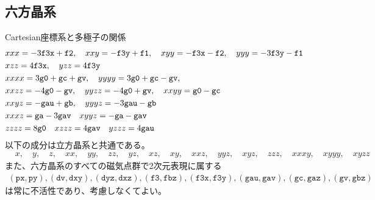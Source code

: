 \documentclass[11pt]{easymemo}
\begin{document}
\subsection{六方晶系}
Cartesian座標系と多極子の関係
\begin{align}
&
xxx= -3 \texttt{f3x} + \texttt{f2},
\quad
xxy= -\texttt{f3y} + \texttt{f1},
\quad
xyy= -\texttt{f3x} - \texttt{f2},
\quad
yyy= -3 \texttt{f3y} - \texttt{f1}
\cr&
xzz= 4 \texttt{f3x},
\quad
yzz= 4 \texttt{f3y}
\cr&
xxxx= 3 \texttt{g0} + \texttt{gc} + \texttt{gv},
\quad
yyyy= 3 \texttt{g0} + \texttt{gc} - \texttt{gv},
\cr&
xxzz= -4 \texttt{g0} - \texttt{gv},
\quad
yyzz= -4 \texttt{g0} + \texttt{gv},
\quad
xxyy= \texttt{g0} - \texttt{gc}
\cr&
xxyz= -\texttt{gau} + \texttt{gb},
\quad
yyyz= -3 \texttt{gau} - \texttt{gb}
\cr&
xxxz= \texttt{ga} - 3 \texttt{gav}
\quad
xyyz= -\texttt{ga} - \texttt{gav}
\cr&
zzzz= 8 \texttt{g0}
\quad
xzzz= 4 \texttt{gav}
\quad
yzzz= 4 \texttt{gau}
\label{cmprel2}
\end{align}
以下の成分は立方晶系と共通である。
\begin{align}
&
x,
\quad
y,
\quad
z,
\quad
xx,
\quad
yy,
\quad
zz,
\quad
yz,
\quad
xz,
\quad
xy,
\quad
xxz,
\quad
yyz,
\quad
xyz,
\quad
zzz,
\quad
xxxy,
\quad
xyyy,
\quad
xyzz
\end{align}
また、六方晶系のすべての磁気点群で2次元表現に属する
\begin{align}
(\texttt{px},
\texttt{py}),
(\texttt{dv},
\texttt{dxy}),
(\texttt{dyz},
\texttt{dxz}),
(\texttt{f3},
\texttt{fbz}),
(\texttt{f3x},
\texttt{f3y}),
(\texttt{gau},
\texttt{gav}),
(\texttt{gc},
\texttt{gaz}),
(\texttt{gv},
\texttt{gbz})
\end{align}
は常に不活性であり、考慮しなくてよい。
\end{document}
